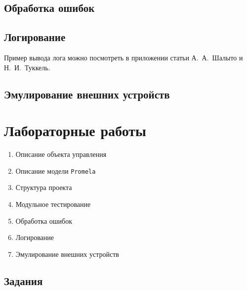 \documentclass[12pt, twoside]{report}
\begin{document}
\newpage
\section*{Обработка ошибок}\label{practical_work_5}

\newpage
\section*{Логирование}\label{practical_work_6}

Пример вывода лога можно посмотреть в приложении статьи А.~А.~Шалыто и Н.~И.~Туккель\cite{Shalito:Switch}.

\newpage
\section*{Эмулирование внешних устройств}\label{practical_work_7}


\newpage
\chapter*{Лабораторные работы}\label{labs_works}

\begin{enumerate}
  \item Описание объекта управления
  \item Описание модели \texttt{Promela}
  \item Структура проекта
  \item Модульное тестирование 
  \item Обработка ошибок
  \item Логирование
  \item Эмулирование внешних устройств
\end{enumerate}

\section*{Задания}\label{lab_work_formatting}
\end{document}
